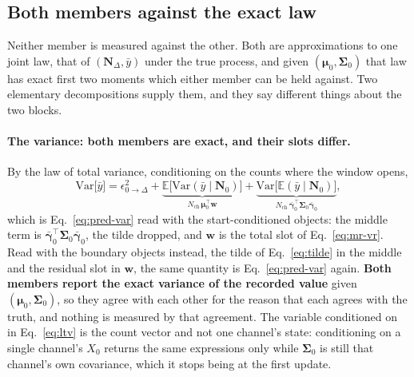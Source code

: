 \begin{appendixbox}
\subsection*{Both members against the exact law}

Neither member is measured against the other. Both are approximations to one joint law, that of
$(\mathbf{N}_\Delta,\bar y)$ under the true process, and given
$(\bm{\mu}_0,\bm{\Sigma}_0)$ that law has exact first two moments which either member can be held
against. Two elementary decompositions supply them, and they say different things about the two
blocks.

\paragraph{The variance: both members are exact, and their slots differ.}
By the law of total variance, conditioning on the counts where the window opens,
\begin{equation}
  \mathrm{Var}\bigl[\bar y\bigr]
  = \epsilon^2_{0\to\Delta}
  + \underbrace{\mathbb{E}\bigl[\mathrm{Var}(\bar y \mid \mathbf{N}_0)\bigr]}_{N_{\mathrm{ch}}\,\bm{\mu}_0^\top\mathbf{w}}
  + \underbrace{\mathrm{Var}\bigl[\mathbb{E}(\bar y \mid \mathbf{N}_0)\bigr]}_{N_{\mathrm{ch}}\,\bar{\bm{\gamma}}_{0}^\top\bm{\Sigma}_0\bar{\bm{\gamma}}_{0}} ,
  \label{eq:ltv}
\end{equation}
which is Eq.~\ref{eq:pred-var} read with the start-conditioned objects: the middle term is
$\bar{\bm{\gamma}}_0^\top\bm{\Sigma}_0\bar{\bm{\gamma}}_0$, the tilde dropped, and $\mathbf{w}$ is
the total slot of Eq.~\ref{eq:mr-vr}. Read with the boundary objects instead, the tilde of
Eq.~\ref{eq:tilde} in the middle and the residual slot in $\mathbf{w}$, the same quantity is
Eq.~\ref{eq:pred-var} again. \textbf{Both members report the exact
variance of the recorded value} given $(\bm{\mu}_0,\bm{\Sigma}_0)$, so they agree with each other
for the reason that each agrees with the truth, and nothing is measured by that agreement.
The variable conditioned on in Eq.~\ref{eq:ltv} is the count vector and not one channel's state:
conditioning on a single channel's $X_0$ returns the same expressions only while $\bm{\Sigma}_0$ is
still that channel's own covariance, which it stops being at the first update.


\end{appendixbox}
